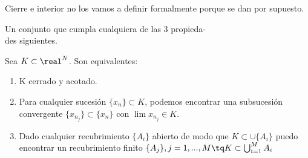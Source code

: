 \documentclass{apuntes}
\begin{document}
\begin{remark}
Cierre e interior no los vamos a definir formalmente porque se dan por supuesto.
\end{remark}

\begin{defn}
Un conjunto que cumpla cualquiera de las 3 propieda-\\des siguientes.
\end{defn}

\begin{theorem}
Sea $K \subset \real^N$. Son equivalentes:
\begin{enumerate}
 \item \label{propCerrado} K cerrado y acotado.
 \item \label{propSucesion} Para cualquier sucesión $\{x_n\} \subset K$, podemos encontrar una subsucesión convergente $\{x_{n_j}\} \subset\{x_n\}$ con $\lim x_{n_j} \in K$.
 \item \label{propRecubrimiento} Dado cualquier recubrimiento $\{A_i\}$ abierto de modo que $K \subset \cup \{A_i\}$ puedo encontrar un recubrimiento finito $\{A_j\}, j=1,...,M \tq K \subset \bigcup_{i=1}^M A_i$
\end{enumerate}
\end{theorem}
\end{document}
